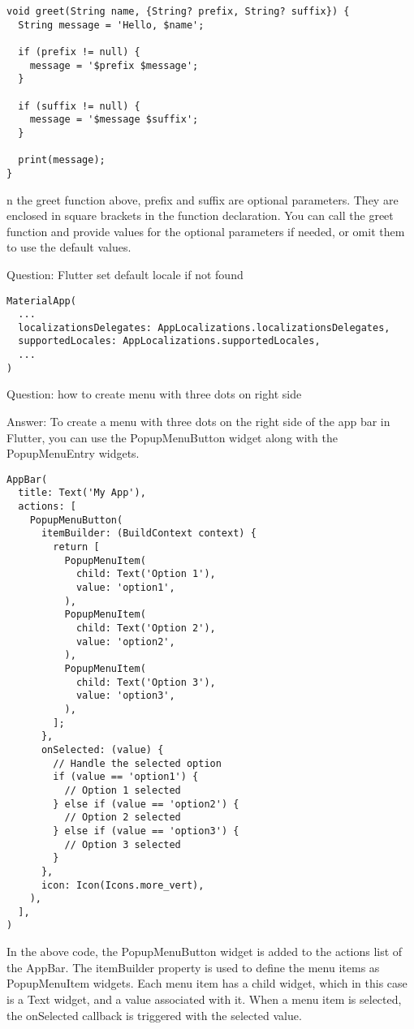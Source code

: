 \begin{lstlisting}
void greet(String name, {String? prefix, String? suffix}) {
  String message = 'Hello, $name';

  if (prefix != null) {
    message = '$prefix $message';
  }

  if (suffix != null) {
    message = '$message $suffix';
  }

  print(message);
}
\end{lstlisting}

n the greet function above, prefix and suffix are optional parameters. They are enclosed in square brackets 
in the function declaration. You can call the greet function and provide values for the optional parameters 
if needed, or omit them to use the default values. 

Question: Flutter set default locale if not found

\begin{lstlisting}
MaterialApp(
  ...
  localizationsDelegates: AppLocalizations.localizationsDelegates,
  supportedLocales: AppLocalizations.supportedLocales,
  ...
)
\end{lstlisting}

Question: how to create menu with three dots on right side

Answer: To create a menu with three dots on the right side of the app bar in Flutter, you can use the PopupMenuButton 
widget along with the PopupMenuEntry widgets.

\begin{lstlisting}
AppBar(
  title: Text('My App'),
  actions: [
    PopupMenuButton(
      itemBuilder: (BuildContext context) {
        return [
          PopupMenuItem(
            child: Text('Option 1'),
            value: 'option1',
          ),
          PopupMenuItem(
            child: Text('Option 2'),
            value: 'option2',
          ),
          PopupMenuItem(
            child: Text('Option 3'),
            value: 'option3',
          ),
        ];
      },
      onSelected: (value) {
        // Handle the selected option
        if (value == 'option1') {
          // Option 1 selected
        } else if (value == 'option2') {
          // Option 2 selected
        } else if (value == 'option3') {
          // Option 3 selected
        }
      },
      icon: Icon(Icons.more_vert),
    ),
  ],
)
\end{lstlisting}

In the above code, the PopupMenuButton widget is added to the actions list of the AppBar. The itemBuilder property 
is used to define the menu items as PopupMenuItem widgets. Each menu item has a child widget, which in this case 
is a Text widget, and a value associated with it. When a menu item is selected, the onSelected callback is 
triggered with the selected value.

